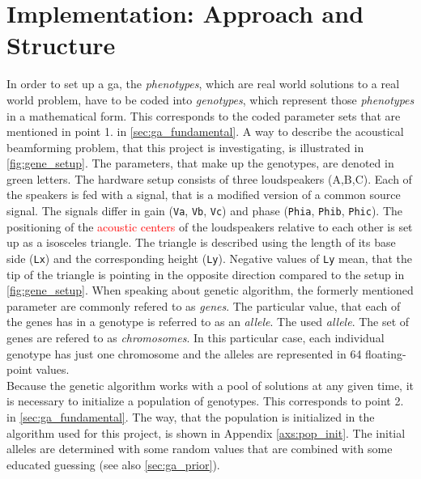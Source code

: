 \section{Implementation: Approach and Structure}
In order to set up a \gls{ga}, the \textit{phenotypes}, which are real world solutions to a real world problem, have to be coded into \textit{genotypes}, which represent those \textit{phenotypes} in a mathematical form. This corresponds to the coded parameter sets that are mentioned in point 1. in \autoref{sec:ga_fundamental}.
A way to describe the acoustical beamforming problem, that this project is investigating, is illustrated in \autoref{fig:gene_setup}. The parameters, that make up the genotypes, are denoted in \textcolor{green3}{green} letters. The hardware setup consists of three loudspeakers (A,B,C). Each of the speakers is fed with a signal, that is a modified version of a common source signal. The signals differ in gain (\textcolor{green3}{\texttt{Va}}, \textcolor{green3}{\texttt{Vb}}, \textcolor{green3}{\texttt{Vc}}) and phase (\textcolor{green3}{\texttt{Phia}}, \textcolor{green3}{\texttt{Phib}}, \textcolor{green3}{\texttt{Phic}}). The positioning of the \textcolor{red}{acoustic centers} of the loudspeakers relative to each other is set up as a isosceles triangle. The triangle is described using the length of its base side (\textcolor{green3}{\texttt{Lx}}) and the corresponding height (\textcolor{green3}{\texttt{Ly}}). Negative values of \textcolor{green3}{\texttt{Ly}} mean, that the tip of the triangle is pointing in the opposite direction compared to the setup in \autoref{fig:gene_setup}. When speaking about genetic algorithm, the formerly mentioned parameter are commonly refered to as \textit{genes}. The particular value, that each of the genes has in a genotype is referred to as an \textit{allele}. The used \textit{allele}. The set of genes are refered to as \textit{chromosomes}. In this particular case, each individual genotype has just one chromosome and the alleles are represented in \SI{64}{\bit} floating-point values.\\
Because the genetic algorithm works with a pool of solutions at any given time, it is necessary to initialize a population of genotypes. This corresponds to point 2. in \autoref{sec:ga_fundamental}. The way, that the population is initialized in the algorithm used for this project, is shown in Appendix \ref{axs:pop_init}. The initial alleles are determined with some random values that are combined with some educated guessing (see also \autoref{sec:ga_prior}).\\
